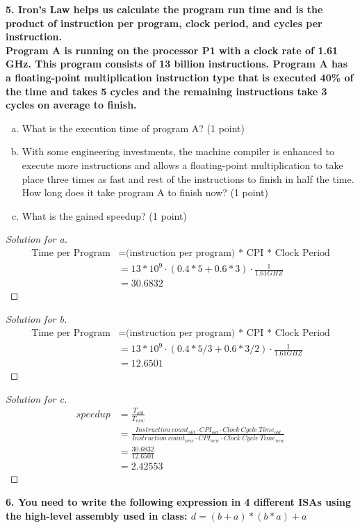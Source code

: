 \documentclass[12pt]{article}
\begin{document}
\textbf{5. Iron’s Law helps us calculate the program run time and is the product of instruction per program, clock period, and cycles per instruction.\\Program A is running on the processor P1 with a clock rate of 1.61 GHz. This program consists of 13 billion instructions. Program A has a floating-point multiplication instruction type that is executed 40\% of the time and takes 5 cycles and the remaining instructions take 3 cycles on average to finish.}\\

\begin{enumerate}[a)]
	\item What is the execution time of program A? (1 point)
	\item With some engineering investments, the machine compiler is enhanced to execute more instructions and allows a floating-point multiplication to take place three times as fast and rest of the instructions to finish in half the time. How long does it take program A to finish now? (1 point)
	\item What is the gained speedup? (1 point)
\end{enumerate}
\begin{proof}[Solution for a]
	\begin{align*}
		\text{Time per Program} &= \text{(instruction per program) * CPI * Clock Period}\\
		&=13*10^9\cdot(0.4*5+0.6*3)\cdot\frac{1}{1.61GHZ}\\
		&=30.6832
	\end{align*}
\end{proof}

\begin{proof}[Solution for b]
	\begin{align*}
		\text{Time per Program} &= \text{(instruction per program) * CPI * Clock Period}\\
		&=13*10^9\cdot(0.4*5/3+0.6*3/2)\cdot\frac{1}{1.61GHZ}\\
		&=12.6501
	\end{align*}
\end{proof}
\begin{proof}[Solution for c]
	\begin{align*}
		speedup&=\frac{T_{old}}{T_{new}}\\
		&=\frac{Instruction\ count_{old} \cdot CPI_{old} \cdot Clock\ Cycle\ Time_{old}}{Instruction\ count_{new} \cdot CPI_{new} \cdot Clock\ Cycle\ Time_{new}}\\
		&=\frac{30.6832}{12.6501}\\
		&=2.42553
	\end{align*}
\end{proof}
\textbf{6. You need to write the following expression in 4 different ISAs using the high-level assembly used in class: $d = (b+a)*(b*a)+a$
}\\
\end{document}
